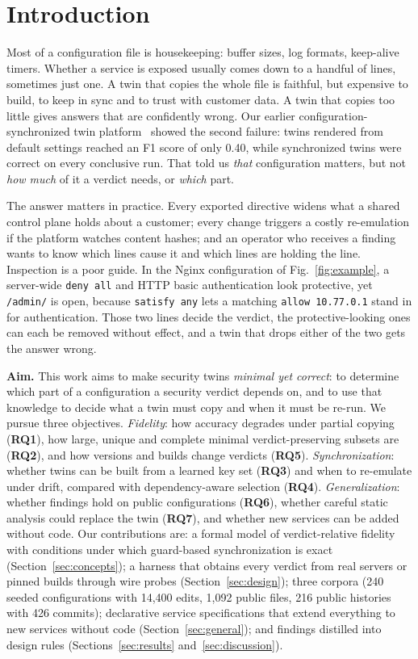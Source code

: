 \documentclass[conference]{IEEEtran}
\newcommand{\RQ}[1]{\textbf{RQ#1}}
\begin{document}
\section{Introduction}

Most of a configuration file is housekeeping: buffer sizes, log formats, keep-alive timers. Whether a service is exposed usually comes down to a handful of lines, sometimes just one. A twin that copies the whole file is faithful, but expensive to build, to keep in sync and to trust with customer data. A twin that copies too little gives answers that are confidently wrong. Our earlier configuration-synchronized twin platform~\cite{dtplatform} showed the second failure: twins rendered from default settings reached an F1 score of only 0.40, while synchronized twins were correct on every conclusive run. That told us \emph{that} configuration matters, but not \emph{how much} of it a verdict needs, or \emph{which} part.

The answer matters in practice. Every exported directive widens what a shared control plane holds about a customer; every change triggers a costly re-emulation if the platform watches content hashes; and an operator who receives a finding wants to know which lines cause it and which lines are holding the line. Inspection is a poor guide. In the Nginx configuration of Fig.~\ref{fig:example}, a server-wide \texttt{deny all} and HTTP basic authentication look protective, yet \texttt{/admin/} is open, because \texttt{satisfy any} lets a matching \texttt{allow 10.77.0.1} stand in for authentication. Those two lines decide the verdict, the protective-looking ones can each be removed without effect, and a twin that drops either of the two gets the answer wrong.

\textbf{Aim.} This work aims to make security twins \emph{minimal yet correct}: to determine which part of a configuration a security verdict depends on, and to use that knowledge to decide what a twin must copy and when it must be re-run. We pursue three objectives. \emph{Fidelity}: how accuracy degrades under partial copying (\RQ{1}), how large, unique and complete minimal verdict-preserving subsets are (\RQ{2}), and how versions and builds change verdicts (\RQ{5}). \emph{Synchronization}: whether twins can be built from a learned key set (\RQ{3}) and when to re-emulate under drift, compared with dependency-aware selection (\RQ{4}). \emph{Generalization}: whether findings hold on public configurations (\RQ{6}), whether careful static analysis could replace the twin (\RQ{7}), and whether new services can be added without code. Our contributions are: a formal model of verdict-relative fidelity with conditions under which guard-based synchronization is exact (Section~\ref{sec:concepts}); a harness that obtains every verdict from real servers or pinned builds through wire probes (Section~\ref{sec:design}); three corpora (240 seeded configurations with 14,400 edits, 1,092 public files, 216 public histories with 426 commits); declarative service specifications that extend everything to new services without code (Section~\ref{sec:general}); and findings distilled into design rules (Sections~\ref{sec:results} and~\ref{sec:discussion}).
\end{document}
